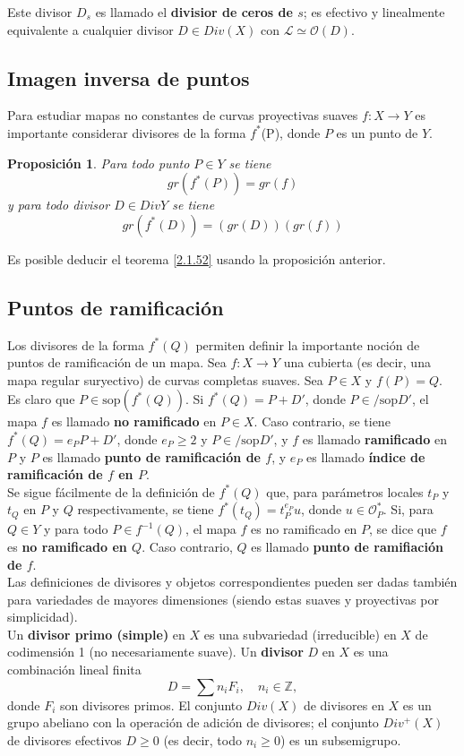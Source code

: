 \documentclass[12pt,a4paper]{report}
\newcommand{\noin}{\in \!\!\!\!\! / }
\newcommand{\Ou}{\mathscr{O}}
\newcommand{\sop}{\mbox{sop}}
\newcommand{\Li}{\mathscr{L}}
\newcommand{\ds}{\displaystyle}
\newtheorem{prop}{Proposición}[chapter]
\begin{document}
Este divisor $D_{s}$ es llamado el \textbf{divisior de ceros de $s$}; es efectivo y linealmente equivalente a cualquier divisor $D\in Div (X)$ con $\Li \simeq \Ou (D)$.


\subsection{Imagen inversa de puntos}
Para estudiar mapas no constantes de curvas proyectivas suaves $f: X \rightarrow Y$  es importante considerar divisores de la forma $f^{*}$(P), donde $P$ es un punto de $Y$.

\begin{prop}
	Para todo punto $P \in Y$ se tiene $$ gr (f^{*}(P)) = gr (f) $$ y para todo divisor $D \in Div  Y$ se tiene $$gr (f^{*}(D)) = (gr (D)) (gr(f)) $$
\end{prop}

Es posible deducir el teorema \ref{2.1.52} usando la proposición anterior.

\subsection{Puntos de ramificación}
Los divisores de la forma $f^{*}(Q)$ permiten definir la importante noción de puntos de ramificación de un mapa. Sea $f: X \rightarrow Y $ una cubierta (es decir, una mapa regular suryectivo) de curvas completas suaves. Sea $P \in X$ y $f(P)= Q$. Es claro que $P \in \sop (f^{*}(Q)) $. Si $f^{*}(Q)= P + D'$, donde $P \noin \sop D'$, el mapa $f$ es llamado \textbf{no ramificado} en $P \in X$. Caso contrario, se tiene $f^{*} (Q)= e_{P} P +D'$, donde $e_{P}\geq 2$ y $P \noin \sop D' $, y $f$ es llamado \textbf{ramificado} en $P$ y $P$ es llamado \textbf{punto de ramificación de $f$}, y $
e_{P}  $ es llamado \textbf{índice de ramificación de $f$ en $P$}. \\
Se sigue fácilmente de la definición de $f^{*}(Q)$ que, para parámetros locales $t_{P}$ y $t_{Q}$ en $P$ y $Q$ respectivamente, se tiene $f^{*} (t_{Q})= t_{P} ^{e_{P}}u $, donde $u \in \Ou ^{*}_{P}$. Si, para $Q \in Y$ y para todo $P \in f^{-1}(Q)$, el mapa $f$ es no ramificado en $P$, se dice que $f$ es \textbf{no ramificado en $Q$}. Caso contrario, $Q$ es llamado \textbf{punto de ramifiación de $f$}.\\

Las definiciones de divisores y objetos correspondientes pueden ser dadas también para variedades de mayores dimensiones (siendo estas suaves y proyectivas por simplicidad).\\
Un \textbf{divisor primo (simple)} en $X$ es una subvariedad (irreducible) en $X$ de codimensión 1 (no necesariamente suave). Un \textbf{divisor} $D$ en $X$ es una combinación lineal finita $$D= \ds \sum n_{i} F_{i} , \quad n_{i} \in \mathbb{Z}, $$ donde $F_{i}$ son divisores primos. El conjunto $ Div (X) $ de divisores en $X$ es un grupo abeliano con la operación de adición de divisores; el conjunto $Div^{+} (X)$ de divisores efectivos $D \geqslant 0$ (es decir, todo $n_{i}\geq 0$) es un subsemigrupo.\\
\end{document}

